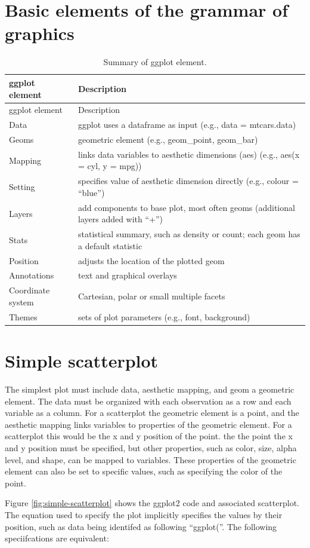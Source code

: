 \documentclass[]{krantz}
\begin{document}
\hypertarget{basic-elements-of-the-grammar-of-graphics}{%
\section{Basic elements of the grammar of graphics}\label{basic-elements-of-the-grammar-of-graphics}}

\begin{longtable}[]{@{}ll@{}}
\caption{\label{tab:test} Summary of ggplot element.}\tabularnewline
\toprule
ggplot element & Description\tabularnewline
\midrule
\endfirsthead
\toprule
ggplot element & Description\tabularnewline
\midrule
\endhead
Data & ggplot uses a dataframe as input (e.g., data = mtcars.data)\tabularnewline
Geoms & geometric element (e.g., geom\_point, geom\_bar)\tabularnewline
Mapping & links data variables to aesthetic dimensions (aes) (e.g., aes(x = cyl, y = mpg))\tabularnewline
Setting & specifies value of aesthetic dimension directly (e.g., colour = ``blue'')\tabularnewline
Layers & add components to base plot, most often geoms (additional layers added with ``+'')\tabularnewline
Stats & statistical summary, such as density or count; each geom has a default statistic\tabularnewline
Position & adjusts the location of the plotted geom\tabularnewline
Annotations & text and graphical overlays\tabularnewline
Coordinate system & Cartesian, polar or small multiple facets\tabularnewline
Themes & sets of plot parameters (e.g., font, background)\tabularnewline
\bottomrule
\end{longtable}

\hypertarget{simple-scatterplot}{%
\section{Simple scatterplot}\label{simple-scatterplot}}

The simplest plot must include data, aesthetic mapping, and geom a geometric element. The data must be organized with each observation as a row and each variable as a column. For a scatterplot the geometric element is a point, and the aesthetic mapping links variables to properties of the geometric element. For a scatterplot this would be the x and y position of the point. the the point the x and y position must be specified, but other properties, such as color, size, alpha level, and shape, can be mapped to variables. These properties of the geometric element can also be set to specific values, such as specifying the color of the point.

Figure \ref{fig:simple-scatterplot} shows the ggplot2 code and associated scatterplot. The equation used to specify the plot implicitly specifies the values by their position, such as data being identifed as following ``ggplot(''. The following speciifcations are equivalent:
\end{document}
